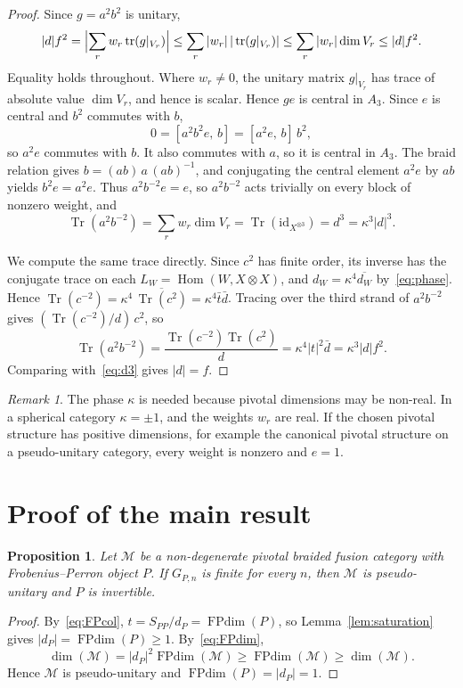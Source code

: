 \documentclass[11pt,oneside]{amsart}
\newtheorem{proposition}[theorem]{Proposition}
\theoremstyle{remark}
\newtheorem{remark}[theorem]{Remark}
\newcommand{\M}{\mathcal M}
\newcommand{\FP}{\operatorname{FPdim}}
\newcommand{\Tr}{\operatorname{Tr}}
\newcommand{\tr}{\operatorname{tr}}
\newcommand{\Hom}{\operatorname{Hom}}
\newcommand{\id}{\mathrm{id}}
\begin{document}
\begin{proof}
\smallskip
Since $g=a^2b^2$ is unitary,
\[
|d|f^2=\Bigl|\sum_rw_r\tr(g|_{V_r})\Bigr|\le\sum_r|w_r|\,|\tr(g|_{V_r})|\le
\sum_r|w_r|\dim V_r\le|d|f^2.
\]
Equality holds throughout. Where $w_r\ne0$, the unitary matrix $g|_{V_r}$ has
trace of absolute value $\dim V_r$, and hence is scalar. Hence $ge$ is central
in $A_3$. Since $e$ is central and $b^2$ commutes with $b$,
\[
0=[a^2b^2e,\,b]=[a^2e,\,b]\,b^2,
\]
so $a^2e$ commutes with $b$. It also commutes with $a$, so it is central in
$A_3$. The braid relation gives $b=(ab)\,a\,(ab)^{-1}$, and conjugating the
central element $a^2e$ by $ab$ yields $b^2e=a^2e$. Thus $a^2b^{-2}e=e$, so
$a^2b^{-2}$ acts trivially on every block of nonzero weight, and
\begin{equation}\label{eq:d3}
\Tr(a^2b^{-2})=\sum_rw_r\dim V_r=\Tr(\id_{X^{\otimes3}})=d^3=\kappa^3|d|^3.
\end{equation}

We compute the same trace directly. Since $c^2$ has finite order, its inverse
has the conjugate trace on each $L_W=\Hom(W,X\otimes X)$, and
$d_W=\kappa^4\overline{d_W}$ by~\eqref{eq:phase}. Hence
$\Tr(c^{-2})=\kappa^4\,\overline{\Tr(c^2)}=\kappa^4\bar t\bar d$. Tracing over
the third strand of $a^2b^{-2}$ gives $(\Tr(c^{-2})/d)\,c^2$, so
\[
\Tr(a^2b^{-2})=\frac{\Tr(c^{-2})\Tr(c^2)}{d}=\kappa^4|t|^2\bar d=\kappa^3|d|f^2 .
\]
Comparing with~\eqref{eq:d3} gives $|d|=f$.
\end{proof}

\begin{remark}
The phase $\kappa$ is needed because pivotal dimensions may be non-real. In a
spherical category $\kappa=\pm1$, and the weights $w_r$ are real. If the
chosen pivotal structure has positive dimensions, for example the canonical
pivotal structure on a pseudo-unitary category, every weight is nonzero and
$e=1$.
\end{remark}

\section{Proof of the main result}\label{sec:main}

\begin{proposition}\label{prop:nondeg}
Let $\M$ be a non-degenerate pivotal braided fusion category with
Frobenius--Perron object $P$. If $G_{P,n}$ is finite for every $n$, then $\M$ is
pseudo-unitary and $P$ is invertible.
\end{proposition}

\begin{proof}
By~\eqref{eq:FPcol}, $t=S_{PP}/d_P=\FP(P)$, so Lemma~\ref{lem:saturation}
gives $|d_P|=\FP(P)\ge1$. By~\eqref{eq:FPdim},
\[
\dim(\M)=|d_P|^2\FP(\M)\ge\FP(\M)\ge\dim(\M).
\]
Hence $\M$ is pseudo-unitary and $\FP(P)=|d_P|=1$.
\end{proof}
\end{document}
